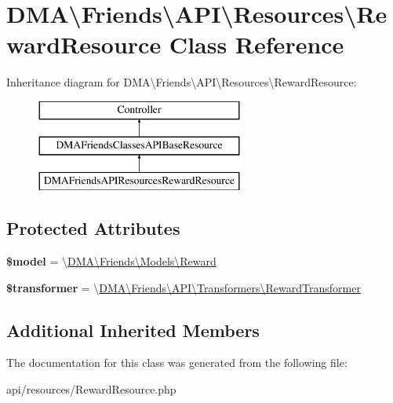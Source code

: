 \hypertarget{classDMA_1_1Friends_1_1API_1_1Resources_1_1RewardResource}{}\section{D\+M\+A\textbackslash{}Friends\textbackslash{}A\+P\+I\textbackslash{}Resources\textbackslash{}Reward\+Resource Class Reference}
\label{classDMA_1_1Friends_1_1API_1_1Resources_1_1RewardResource}
Inheritance diagram for D\+M\+A\textbackslash{}Friends\textbackslash{}A\+P\+I\textbackslash{}Resources\textbackslash{}Reward\+Resource\+:\begin{figure}[H]
\begin{center}
\leavevmode
\includegraphics[height=3.000000cm]{da/d5c/classDMA_1_1Friends_1_1API_1_1Resources_1_1RewardResource}
\end{center}
\end{figure}
\subsection*{Protected Attributes}
\begin{DoxyCompactItemize}
\item 
\hypertarget{classDMA_1_1Friends_1_1API_1_1Resources_1_1RewardResource_a85d20b82f07c9523aecf7bcc357549d1}{}{\bfseries \$model} = \textquotesingle{}\textbackslash{}\hyperlink{classDMA_1_1Friends_1_1Models_1_1Reward}{D\+M\+A\textbackslash{}\+Friends\textbackslash{}\+Models\textbackslash{}\+Reward}\textquotesingle{}\label{classDMA_1_1Friends_1_1API_1_1Resources_1_1RewardResource_a85d20b82f07c9523aecf7bcc357549d1}

\item 
\hypertarget{classDMA_1_1Friends_1_1API_1_1Resources_1_1RewardResource_ac8acd84863c51e75de4f855c0590a767}{}{\bfseries \$transformer} = \textquotesingle{}\textbackslash{}\hyperlink{classDMA_1_1Friends_1_1API_1_1Transformers_1_1RewardTransformer}{D\+M\+A\textbackslash{}\+Friends\textbackslash{}\+A\+P\+I\textbackslash{}\+Transformers\textbackslash{}\+Reward\+Transformer}\textquotesingle{}\label{classDMA_1_1Friends_1_1API_1_1Resources_1_1RewardResource_ac8acd84863c51e75de4f855c0590a767}

\end{DoxyCompactItemize}
\subsection*{Additional Inherited Members}


The documentation for this class was generated from the following file\+:\begin{DoxyCompactItemize}
\item 
api/resources/Reward\+Resource.\+php\end{DoxyCompactItemize}
